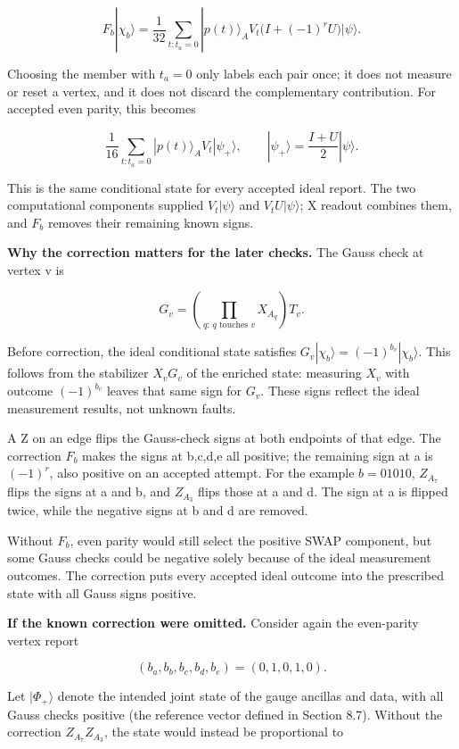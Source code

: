 \documentclass[11pt]{article}
\begin{document}
\[
F_b|\chi_b\rangle
=\frac1{32}\sum_{t:t_a=0}
|p(t)\rangle_A V_t\bigl(I+(-1)^rU\bigr)|\psi\rangle.
\]

Choosing the member with \(t_a=0\) only labels each pair once; it does not measure or reset a vertex, and it does not discard the complementary contribution. For accepted even parity, this becomes

\[
\frac1{16}\sum_{t:t_a=0}|p(t)\rangle_A V_t|\psi_+\rangle,
\qquad |\psi_+\rangle=\frac{I+U}{2}|\psi\rangle.
\]

This is the same conditional state for every accepted ideal report. The two computational components supplied \(V_t|\psi\rangle\) and \(V_tU|\psi\rangle\); X readout combines them, and \(F_b\) removes their remaining known signs.

\textbf{Why the correction matters for the later checks.} The Gauss check at vertex v is

\[
G_v=\left(\prod_{q:\,q\text{ touches }v}X_{A_q}\right)T_v.
\]

Before correction, the ideal conditional state satisfies \(G_v|\chi_b\rangle=(-1)^{b_v}|\chi_b\rangle\). This follows from the stabilizer \(X_vG_v\) of the enriched state: measuring \(X_v\) with outcome \((-1)^{b_v}\) leaves that same sign for \(G_v\). These signs reflect the ideal measurement results, not unknown faults.

A Z on an edge flips the Gauss-check signs at both endpoints of that edge. The correction \(F_b\) makes the signs at b,c,d,e all positive; the remaining sign at a is \((-1)^r\), also positive on an accepted attempt. For the example \(b=01010\), \(Z_{A_7}\) flips the signs at a and b, and \(Z_{A_3}\) flips those at a and d. The sign at a is flipped twice, while the negative signs at b and d are removed.

Without \(F_b\), even parity would still select the positive SWAP component, but some Gauss checks could be negative solely because of the ideal measurement outcomes. The correction puts every accepted ideal outcome into the prescribed state with all Gauss signs positive.

\textbf{If the known correction were omitted.} Consider again the even-parity vertex report

\[
(b_a,b_b,b_c,b_d,b_e)=(0,1,0,1,0).
\]

Let \(|\Phi_+\rangle\) denote the intended joint state of the gauge ancillas and data, with all Gauss checks positive (the reference vector defined in Section 8.7). Without the correction \(Z_{A_7}Z_{A_3}\), the state would instead be proportional to
\end{document}
